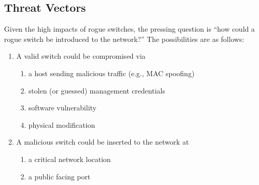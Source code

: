 \documentclass[journal]{IEEEtran}
\begin{document}
\subsection{Threat Vectors}
Given the high impacts of rogue switches, the pressing question is ``how could a rogue switch be
introduced to the network?'' The possibilities are as follows:

\begin{enumerate}
  \item A valid switch could be compromised via
  \begin{enumerate}
    \item a host sending malicious traffic (e.g., MAC spoofing)
    \item stolen (or guessed) management credentials
    \item software vulnerability
    \item physical modification
  \end{enumerate}
  \item A malicious switch could be inserted to the network at
  \begin{enumerate}
    \item a critical network location
    \item a public facing port
  \end{enumerate}
\end{enumerate}
\end{document}
